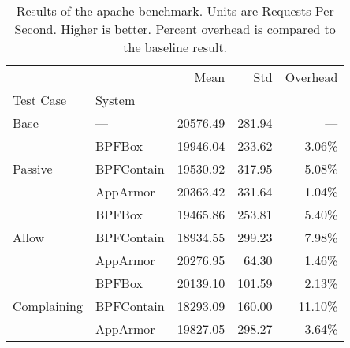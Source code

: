 \begin{table}[htp!]
\centering
\footnotesize
\caption[Results of the apache benchmark]{Results of the apache benchmark. Units are Requests Per Second. Higher is better. Percent overhead is compared to the baseline result.}
\label{tab:phoronix-apache}
\begin{tabular}{llrrr}
\toprule
            &          &      Mean &     Std & Overhead \\
Test Case & System &           &         &          \\
\midrule
Base & --- &  20576.49 &  281.94 &      --- \\
\cline{1-5}
\multirow{3}{*}{Passive} & BPFBox &  19946.04 &  233.62 &   3.06\% \\
            & BPFContain &  19530.92 &  317.95 &   5.08\% \\
            & AppArmor &  20363.42 &  331.64 &   1.04\% \\
\cline{1-5}
\multirow{3}{*}{Allow} & BPFBox &  19465.86 &  253.81 &   5.40\% \\
            & BPFContain &  18934.55 &  299.23 &   7.98\% \\
            & AppArmor &  20276.95 &   64.30 &   1.46\% \\
\cline{1-5}
\multirow{3}{*}{Complaining} & BPFBox &  20139.10 &  101.59 &   2.13\% \\
            & BPFContain &  18293.09 &  160.00 &  11.10\% \\
            & AppArmor &  19827.05 &  298.27 &   3.64\% \\
\bottomrule
\end{tabular}
\end{table}

